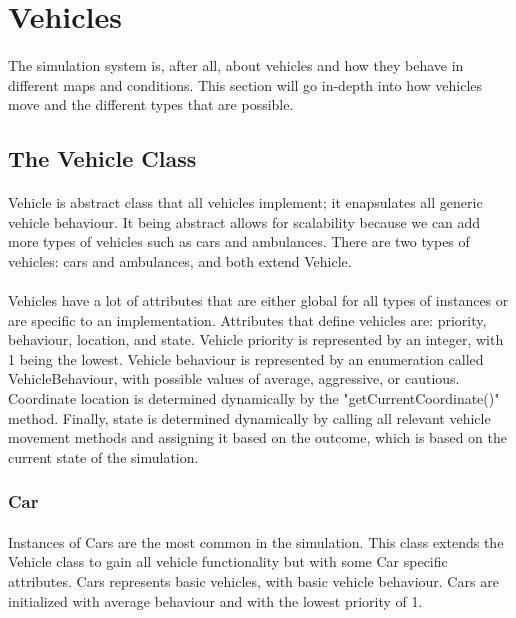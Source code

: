 \documentclass[a4paper,11pt,titlepage]{article}
\begin{document}
\section{Vehicles}
\paragraph{}
The simulation system is, after all, about vehicles and how they behave in different maps and conditions. This section will go in-depth into how vehicles move and the different types that are possible.
\subsection{The Vehicle Class}
\paragraph{}
Vehicle is abstract class that all vehicles implement; it enapsulates all generic vehicle behaviour. It being abstract allows for scalability because we can add more types of vehicles such as cars and ambulances. There are two types of vehicles: cars and ambulances, and both extend Vehicle.
\paragraph{}
Vehicles have a lot of attributes that are either global for all types of instances or are specific to an implementation. Attributes that define vehicles are: priority, behaviour, location, and state. Vehicle priority is represented by an integer, with 1 being the lowest. Vehicle behaviour is represented by an enumeration called VehicleBehaviour, with possible values of average, aggressive, or cautious. Coordinate location is determined dynamically by the "getCurrentCoordinate()" method. Finally, state is determined dynamically by calling all relevant vehicle movement methods and assigning it based on the outcome, which is based on the current state of the simulation.
\subsubsection{Car}
\paragraph{}
Instances of Cars are the most common in the simulation. This class extends the Vehicle class to gain all vehicle functionality but with some Car specific attributes. Cars represents basic vehicles, with basic vehicle behaviour. Cars are initialized with average behaviour and with the lowest priority of 1.
\end{document}
